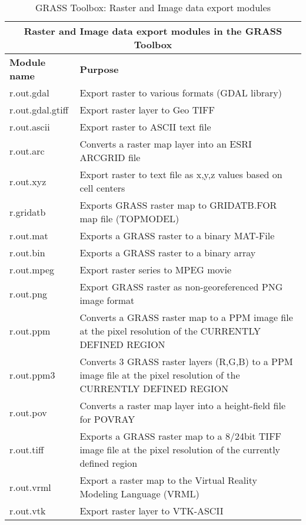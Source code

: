 \begin{table}[H]
\centering
 \begin{tabular}{|p{4cm}|p{10cm}|}
  \hline \multicolumn{2}{|c|}{\textbf{Raster and Image data export modules in
the GRASS
  Toolbox}} \\
  \hline \textbf{Module name} & \textbf{Purpose} \\
  \hline r.out.gdal & Export raster to various formats (GDAL library) \\
  \hline r.out.gdal.gtiff & Export raster layer to Geo TIFF \\
  \hline r.out.ascii & Export raster to ASCII text file \\
  \hline r.out.arc & Converts a raster map layer into an ESRI ARCGRID file \\
  \hline r.out.xyz & Export raster to text file as x,y,z values based on cell centers \\
  \hline r.gridatb & Exports GRASS raster map to GRIDATB.FOR map file
  (TOPMODEL) \\
  \hline r.out.mat & Exports a GRASS raster to a binary MAT-File \\
  \hline r.out.bin & Exports a GRASS raster to a binary array \\
  \hline r.out.mpeg & Export raster series to MPEG movie \\
  \hline r.out.png & Export GRASS raster as non-georeferenced PNG image
  format \\
  \hline r.out.ppm & Converts a GRASS raster map to a PPM image file at the
  pixel resolution of the CURRENTLY DEFINED REGION \\
  \hline r.out.ppm3 & Converts 3 GRASS raster layers (R,G,B) to a PPM image
  file at the pixel resolution of the CURRENTLY DEFINED REGION \\
  \hline r.out.pov & Converts a raster map layer into a height-field file for
  POVRAY\\
  \hline r.out.tiff & Exports a GRASS raster map to a 8/24bit TIFF image file
  at the pixel resolution of the currently defined region\\
  \hline r.out.vrml &  Export a raster map to the Virtual Reality Modeling
  Language (VRML)\\
  \hline r.out.vtk & Export raster layer to VTK-ASCII \\
\hline
\end{tabular}
\caption{GRASS Toolbox: Raster and Image data export modules}
\end{table}



